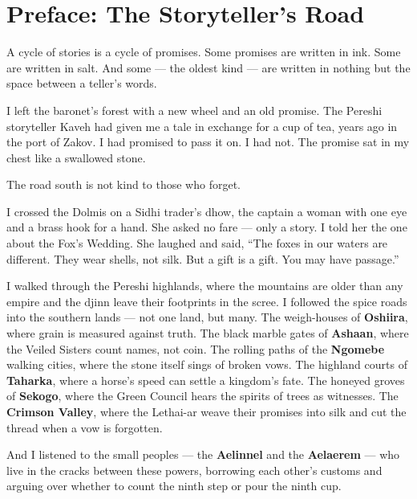 \documentclass[10pt,twoside]{book}
\begin{document}




\tableofcontents

\chapter*{Preface: The Storyteller's Road}

A cycle of stories is a cycle of promises. Some promises are written in ink. Some are written in salt. And some --- the oldest kind --- are written in nothing but the space between a teller's words.

I left the baronet's forest with a new wheel and an old promise. The Pereshi storyteller Kaveh had given me a tale in exchange for a cup of tea, years ago in the port of Zakov. I had promised to pass it on. I had not. The promise sat in my chest like a swallowed stone.

The road south is not kind to those who forget.

I crossed the Dolmis on a Sidhi trader's dhow, the captain a woman with one eye and a brass hook for a hand. She asked no fare --- only a story. I told her the one about the Fox's Wedding. She laughed and said, ``The foxes in our waters are different. They wear shells, not silk. But a gift is a gift. You may have passage.''

I walked through the Pereshi highlands, where the mountains are older than any empire and the djinn leave their footprints in the scree. I followed the spice roads into the southern lands --- not one land, but many. The weigh-houses of \textbf{Oshiira}, where grain is measured against truth. The black marble gates of \textbf{Ashaan}, where the Veiled Sisters count names, not coin. The rolling paths of the \textbf{Ngomebe} walking cities, where the stone itself sings of broken vows. The highland courts of \textbf{Taharka}, where a horse's speed can settle a kingdom's fate. The honeyed groves of \textbf{Sekogo}, where the Green Council hears the spirits of trees as witnesses. The \textbf{Crimson Valley}, where the Lethai-ar weave their promises into silk and cut the thread when a vow is forgotten.

And I listened to the small peoples --- the \textbf{Aelinnel} and the \textbf{Aelaerem} --- who live in the cracks between these powers, borrowing each other's customs and arguing over whether to count the ninth step or pour the ninth cup.
\end{document}
